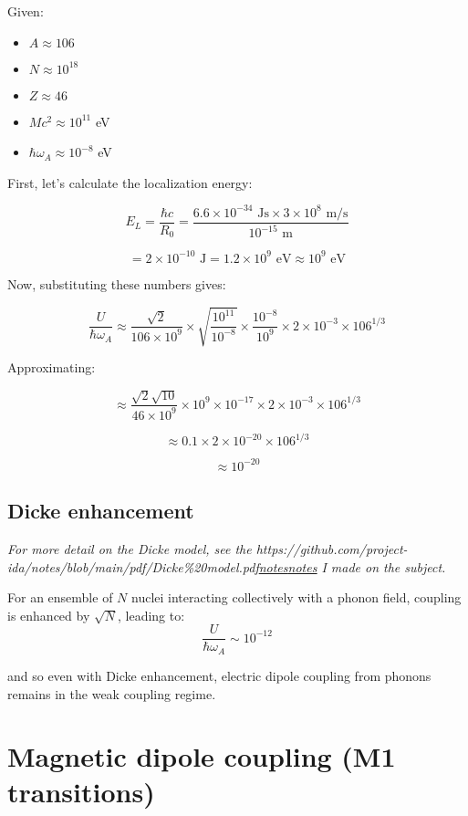 \documentclass[
]{article}
\let\oldhref\href
\renewcommand{\href}[2]{\ifx#1\urlprefix\oldhref{#1}{#2}\else\uline{\oldhref{#1}{#2}}\fi}
\renewcommand{\[}{\begin{equation}}
\renewcommand{\]}{\end{equation}}
\providecommand{\tightlist}{%
  \setlength{\itemsep}{0pt}\setlength{\parskip}{0pt}}
\begin{document}
Given:

\begin{itemize}
\tightlist
\item
  \(A \approx 106\)
\item
  \(N \approx 10^{18}\)
\item
  \(Z \approx 46\)
\item
  \(M c^2 \approx 10^{11}\) eV
\item
  \(\hbar \omega_A \approx 10^{-8}\) eV
\end{itemize}

First, let's calculate the localization energy:

\[
E_L = \frac{\hbar c}{R_0} = \frac{6.6 \times 10^{-34} \text{ Js} \times 3 \times 10^8 \text{ m/s}}{10^{-15} \text{ m}}
\]

\[
= 2 \times 10^{-10} \text{ J} = 1.2 \times 10^9 \text{ eV} \approx 10^9 \text{ eV}
\]

Now, substituting these numbers gives:

\[
\frac{U}{\hbar \omega_A} \approx \frac{\sqrt{2} }{106 \times 10^9} \times \sqrt{\frac{10^{11}}{10^{-8}}} \times \frac{10^{-8}}{10^9} \times 2 \times 10^{-3} \times 106^{1/3}
\]

Approximating:

\[
\approx \frac{\sqrt{2} \sqrt{10}}{46 \times 10^9} \times 10^9 \times 10^{-17} \times 2 \times 10^{-3} \times 106^{1/3}
\]

\[
\approx 0.1 \times 2 \times 10^{-20} \times 106^{1/3}
\]

\[
\approx 10^{-20}
\]

\subsection{Dicke enhancement}\label{dicke-enhancement-1}

\emph{For more detail on the Dicke model, see the
\href{https://github.com/project-ida/notes/blob/main/pdf/Dicke\%20model.pdf}{notes}
I made on the subject.}

For an ensemble of \(N\) nuclei interacting collectively with a phonon
field, coupling is enhanced by \(\sqrt{N}\), leading to: \[
\frac{U}{\hbar \omega_A} \sim 10^{-12}
\]

and so even with Dicke enhancement, electric dipole coupling from
phonons remains in the weak coupling regime.

\section{Magnetic dipole coupling (M1
transitions)}\label{magnetic-dipole-coupling-m1-transitions}
\end{document}
